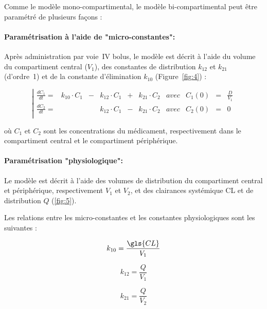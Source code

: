 Comme le modèle mono-compartimental, le modèle bi-compartimental peut être paramétré de plusieurs façons :

\paragraph*{Paramétrisation à l'aide de "micro-constantes":} Après administration par voie~\gls{IV} bolus, le modèle est décrit à l'aide du volume du compartiment central ($V_1$), des constantes de distribution $k_{12}$ et $k_{21}$ (d'ordre~1) et de la constante d'élimination $k_{10}$ (Figure~\ref{fig:4}) :

\begin{equation}
\left| \begin{matrix}
\frac{dC_1}{dt} = & k_{10}\cdot C_1 &- &k_{12}\cdot C_1 & + & k_{21}\cdot C_2 & avec & C_1(0)&=&\frac{D}{V_1}\\ 
\frac{dC_2}{dt} = &                 &  &k_{12}\cdot C_1 & - & k_{21}\cdot C_2 & avec & C_2(0)&=&0 \\ 
\end{matrix}\right.
\label{eq:24}
\end{equation}

où $C_1$ et $C_2$ sont les concentrations du médicament, respectivement dans le compartiment central et le compartiment périphérique.

\paragraph*{Paramétrisation "physiologique":} Le modèle est décrit à l'aide des volumes de distribution du compartiment central et périphérique, respectivement $V_1$ et $V_2$, et des clairances systémique \gls{CL} et de distribution $Q$ (\ref{fig:5}). 

Les relations entre les micro-constantes et les constantes physiologiques sont les suivantes :

\begin{equation}
k_{10}  =  \frac{\gls{CL}}{V_1}
\label{eq:25}
\end{equation}

\begin{equation}
k_{12}  =  \frac{Q}{V_1}
\label{eq:26}
\end{equation}

\begin{equation}
k_{21}  =  \frac{Q}{V_2}
\label{eq:27}
\end{equation}

